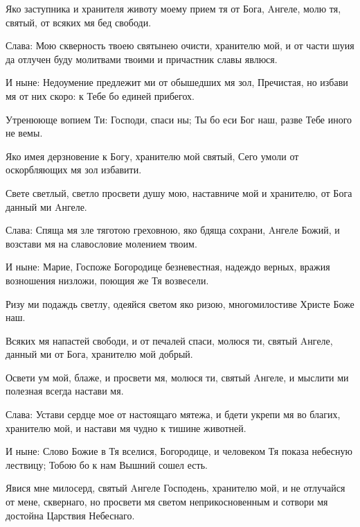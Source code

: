   Яко заступника и хранителя животу моему прием тя от Бога, Aнгеле, молю тя, святый, от всяких мя бед свободи.


  Слава: Мою скверность твоею святынею очисти, хранителю мой, и от части шуия да отлучен буду молитвами твоими и причастник славы явлюся.


  И ныне: Недоумение предлежит ми от обышедших мя зол, Пречистая, но избави мя от них скоро: к Тебе бо единей прибегох.




\medskip 


  Утренююще вопием Ти: Господи, спаси ны; Ты бо еси Бог наш, разве Тебе иного не вемы.


  Яко имея дерзновение к Богу, хранителю мой святый, Сего умоли от оскорбляющих мя зол избавити.


  Свете светлый, светло просвети душу мою, наставниче мой и хранителю, от Бога данный ми Aнгеле.


  Слава: Спяща мя зле тяготою греховною, яко бдяща сохрани, Aнгеле Божий, и возстави мя на славословие молением твоим.


  И ныне: Марие, Госпоже Богородице безневестная, надеждо верных, вражия возношения низложи, поющия же Тя возвесели.




\medskip



  Ризу ми подаждь светлу, одеяйся светом яко ризою, многомилостиве Христе Боже наш.


  Всяких мя напастей свободи, и от печалей спаси, молюся ти, святый Aнгеле, данный ми от Бога, хранителю мой добрый.


  Освети ум мой, блаже, и просвети мя, молюся ти, святый Aнгеле, и мыслити ми полезная всегда настави мя.


  Слава: Устави сердце мое от настоящаго мятежа, и бдети укрепи мя во благих, хранителю мой, и настави мя чудно к тишине животней.


  И ныне: Слово Божие в Тя вселися, Богородице, и человеком Тя показа небесную лествицу; Тобою бо к нам Вышний сошел есть.




\medskip



  Явися мне милосерд, святый Aнгеле Господень, хранителю мой, и не отлучайся от мене, сквернаго, но просвети мя светом неприкосновенным и сотвори мя достойна Царствия Небеснаго.




